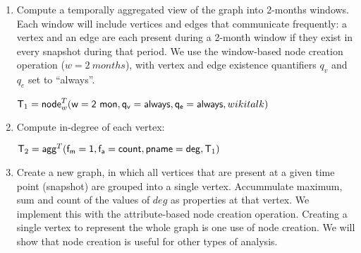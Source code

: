 \begin{enumerate}[noitemsep,,itemindent=\dimexpr\labelwidth+\labelsep\relax,leftmargin=0pt]
\item Compute a temporally aggregated view of the graph into 2-months
  windows.  Each window will include vertices and edges that
  communicate frequently: a vertex and an edge are each present during
  a 2-month window if they exist in every snapshot during that period.
  We use the window-based node creation operation ($w=2~months$), with
  vertex and edge existence quantifiers $q_v$ and $q_e$ set to
  ``always''.


\begin{center}
$\mathsf{T}_1 = \textsf{node}^T_w(\mathsf{w=2~mon},\mathsf{q_v=always},\mathsf{q_e=always},wikitalk)$
\end{center}

\item Compute in-degree of each vertex:

\begin{center}
$\mathsf{T}_2 = \textsf{agg}^T(\mathsf{f_m=1},\mathsf{f_a=count},\mathsf{pname=deg},\mathsf{T}_1)$
\end{center}

\item Create a new graph, in which all vertices that are present at a
  given time point (snapshot) are grouped into a single vertex.
  Accummulate maximum, sum and count of the values of $deg$ as
  properties at that vertex.  We implement this with the
  attribute-based node creation operation.  Creating a single vertex
  to represent the whole graph is one use of node creation.  We will
  show that node creation is useful for other types of analysis.


\end{enumerate}
